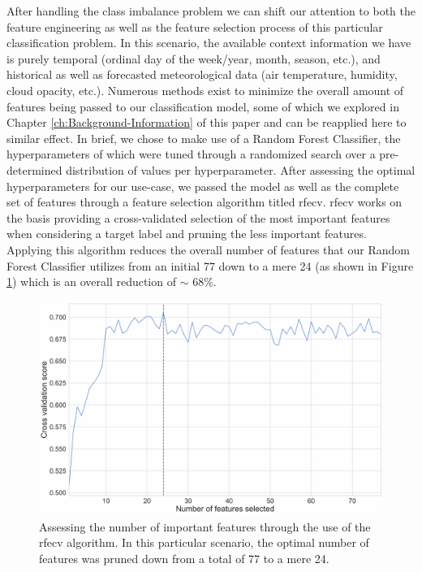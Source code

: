 \noindent \newline After handling the class imbalance problem we can shift our attention to both the feature engineering as well as the feature selection process of this particular classification problem. In this scenario, the available context information we have is purely temporal (ordinal day of the week/year, month, season, etc.), and historical as well as forecasted meteorological data (air temperature, humidity, cloud opacity, etc.). Numerous methods exist to minimize the overall amount of features being passed to our classification model, some of which we explored in Chapter \ref{ch:Background-Information} of this paper and can be reapplied here to similar effect. In brief, we chose to make use of a Random Forest Classifier, the hyperparameters of which were tuned through a randomized search over a pre-determined distribution of values per hyperparameter. After assessing the optimal hyperparameters for our use-case, we passed the model as well as the complete set of features through a feature selection algorithm titled \gls{rfecv}. \gls{rfecv} works on the basis providing a cross-validated selection of the most important features when considering a target label and pruning the less important features. Applying this algorithm reduces the overall number of features that our Random Forest Classifier utilizes from an initial 77 down to a mere 24 (as shown in Figure \ref{fig:UCID-RFECV}) which is an overall reduction of $\sim$ 68\%.

\begin{figure}[H]
    \centering
    \includegraphics[width=\textwidth]{Images/Chapter 5/Stage 4/UCID/UCID-RFECV.pdf}
    \caption{Assessing the number of important features through the use of the \gls{rfecv} algorithm. In this particular scenario, the optimal number of features was pruned down from a total of 77 to a mere 24.}
    \label{fig:UCID-RFECV}
\end{figure}

